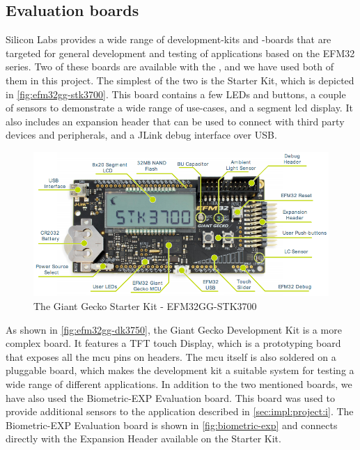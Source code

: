 \subsection{Evaluation boards}

Silicon Labs provides a wide range of development-kits and -boards that are targeted for general development and testing of applications based on the EFM32 series.
Two of these boards are available with the {\gecko}, and we have used both of them in this project.
The simplest of the two is the  Starter Kit, which is depicted in \autoref{fig:efm32gg-stk3700}.
This board contains a few LEDs and buttons, a couple of sensors to demonstrate a wide range of use-cases, and a segment \gls{lcd} display.
It also includes an expansion header that can be used to connect with third party devices and peripherals, and a JLink debug interface over USB.

\begin{figure}[H]
  \begin{center}
    \includegraphics[scale=0.4]{figures/efm32gg-stk3700}
  \end{center}
  \caption{The Giant Gecko Starter Kit - EFM32GG-STK3700 \cite{Labs2013_STK} }
  \label{fig:efm32gg-stk3700}
\end{figure}

As shown in \autoref{fig:efm32gg-dk3750}, the Giant Gecko Development Kit is a more complex board.
It features a TFT touch Display, which is a prototyping board that exposes all the \gls{mcu} pins on headers.
The \gls{mcu} itself is also soldered on a pluggable board, which makes the development kit a suitable system for testing a wide range of different applications.
In addition to the two mentioned boards, we have also used the Biometric-EXP Evaluation board.
This board was used to provide additional sensors to the {\tracker} application described in \autoref{sec:impl:project:i}.
The Biometric-EXP Evaluation board is shown in \autoref{fig:biometric-exp} and connects directly with the Expansion Header available on the Starter Kit.

